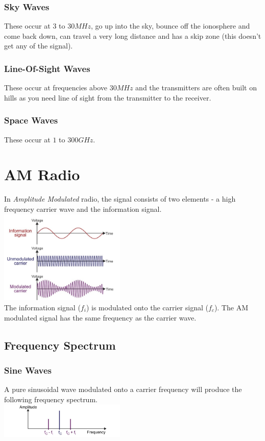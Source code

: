 \documentclass[a4paper,11pt, twocolumn]{article}
\begin{document}
\subsubsection{Sky Waves}
These occur at $3$ to $30MHz$, go up into the sky, bounce off the ionosphere and come back down, can travel a very long distance and has a skip zone (this doesn't get any of the signal).
\subsubsection{Line-Of-Sight Waves}
These occur at frequencies above $30MHz$ and the transmitters are often built on hills as you need line of sight from the transmitter to the receiver.
\subsubsection{Space Waves}
These occur at $1$ to $300GHz$. 

\section{AM Radio}
In \textit{Amplitude Modulated} radio, the signal consists of two elements - a high frequency carrier wave and the information signal.\\
\includegraphics[width=0.45\textwidth]{amWave.jpg}\\
The information signal ($f_i$) is modulated onto the carrier signal ($f_c$). 
The AM modulated signal has the same frequency as the carrier wave. 
\subsection{Frequency Spectrum}
\subsubsection{Sine Waves}
A pure sinusoidal wave modulated onto a carrier frequency will produce the following frequency spectrum.\\
\includegraphics[width=0.45\textwidth]{sineFreqSpec.jpg}
\end{document}
